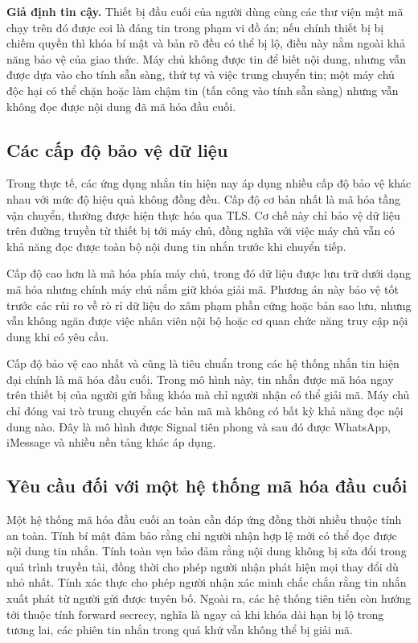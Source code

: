 \textbf{Giả định tin cậy.} Thiết bị đầu cuối của người dùng cùng các thư viện mật mã chạy trên đó được coi là đáng tin trong phạm vi đồ án; nếu chính thiết bị bị chiếm quyền thì khóa bí mật và bản rõ đều có thể bị lộ, điều này nằm ngoài khả năng bảo vệ của giao thức. Máy chủ không được tin để biết nội dung, nhưng vẫn được dựa vào cho tính sẵn sàng, thứ tự và việc trung chuyển tin; một máy chủ độc hại có thể chặn hoặc làm chậm tin (tấn công vào tính sẵn sàng) nhưng vẫn không đọc được nội dung đã mã hóa đầu cuối.

\subsection{Các cấp độ bảo vệ dữ liệu}

Trong thực tế, các ứng dụng nhắn tin hiện nay áp dụng nhiều cấp độ bảo vệ khác nhau với mức độ hiệu quả không đồng đều. Cấp độ cơ bản nhất là mã hóa tầng vận chuyển, thường được hiện thực hóa qua TLS. Cơ chế này chỉ bảo vệ dữ liệu trên đường truyền từ thiết bị tới máy chủ, đồng nghĩa với việc máy chủ vẫn có khả năng đọc được toàn bộ nội dung tin nhắn trước khi chuyển tiếp.

Cấp độ cao hơn là mã hóa phía máy chủ, trong đó dữ liệu được lưu trữ dưới dạng mã hóa nhưng chính máy chủ nắm giữ khóa giải mã. Phương án này bảo vệ tốt trước các rủi ro về rò rỉ dữ liệu do xâm phạm phần cứng hoặc bản sao lưu, nhưng vẫn không ngăn được việc nhân viên nội bộ hoặc cơ quan chức năng truy cập nội dung khi có yêu cầu.

Cấp độ bảo vệ cao nhất và cũng là tiêu chuẩn trong các hệ thống nhắn tin hiện đại chính là mã hóa đầu cuối. Trong mô hình này, tin nhắn được mã hóa ngay trên thiết bị của người gửi bằng khóa mà chỉ người nhận có thể giải mã. Máy chủ chỉ đóng vai trò trung chuyển các bản mã mà không có bất kỳ khả năng đọc nội dung nào. Đây là mô hình được Signal tiên phong và sau đó được WhatsApp, iMessage và nhiều nền tảng khác áp dụng.

\subsection{Yêu cầu đối với một hệ thống mã hóa đầu cuối}

Một hệ thống mã hóa đầu cuối an toàn cần đáp ứng đồng thời nhiều thuộc tính an toàn. Tính bí mật đảm bảo rằng chỉ người nhận hợp lệ mới có thể đọc được nội dung tin nhắn. Tính toàn vẹn bảo đảm rằng nội dung không bị sửa đổi trong quá trình truyền tải, đồng thời cho phép người nhận phát hiện mọi thay đổi dù nhỏ nhất. Tính xác thực cho phép người nhận xác minh chắc chắn rằng tin nhắn xuất phát từ người gửi được tuyên bố. Ngoài ra, các hệ thống tiên tiến còn hướng tới thuộc tính forward secrecy, nghĩa là ngay cả khi khóa dài hạn bị lộ trong tương lai, các phiên tin nhắn trong quá khứ vẫn không thể bị giải mã.

